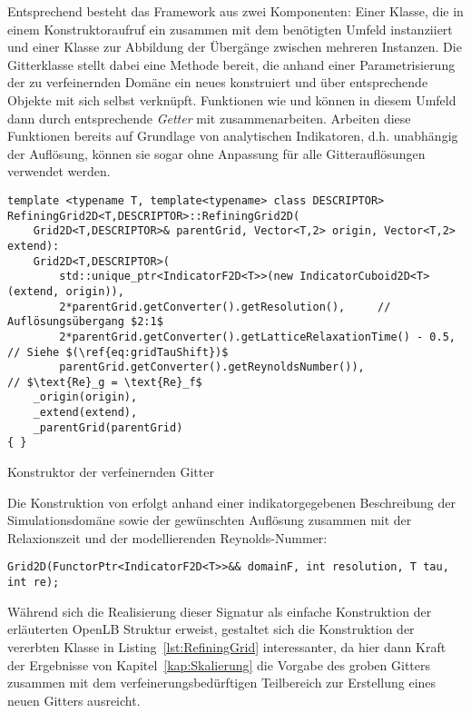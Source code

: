\bigskip
Entsprechend besteht das Framework aus zwei Komponenten: Einer  Klasse, die in einem Konstruktoraufruf ein  zusammen mit dem benötigten Umfeld instanziiert und einer  Klasse zur Abbildung der Übergänge zwischen mehreren  Instanzen. Die Gitterklasse stellt dabei eine Methode  bereit, die anhand einer Parametrisierung der zu verfeinernden Domäne ein neues  konstruiert und über entsprechende  Objekte mit sich selbst verknüpft. Funktionen wie  und  können in diesem Umfeld dann durch entsprechende \emph{Getter} mit  zusammenarbeiten. Arbeiten diese Funktionen bereits auf Grundlage von analytischen Indikatoren, d.h. unabhängig der Auflösung, können sie sogar ohne Anpassung für alle Gitterauflösungen verwendet werden.

\begin{listing}[H]
\begin{verbatim}
template <typename T, template<typename> class DESCRIPTOR>
RefiningGrid2D<T,DESCRIPTOR>::RefiningGrid2D(
	Grid2D<T,DESCRIPTOR>& parentGrid, Vector<T,2> origin, Vector<T,2> extend):
	Grid2D<T,DESCRIPTOR>(
		std::unique_ptr<IndicatorF2D<T>>(new IndicatorCuboid2D<T>(extend, origin)),
		2*parentGrid.getConverter().getResolution(),     // Auflösungsübergang $2:1$
		2*parentGrid.getConverter().getLatticeRelaxationTime() - 0.5, // Siehe $(\ref{eq:gridTauShift})$
		parentGrid.getConverter().getReynoldsNumber()),               // $\text{Re}_g = \text{Re}_f$
	_origin(origin),
	_extend(extend),
	_parentGrid(parentGrid)
{ }
\end{verbatim}
\caption{Konstruktor der verfeinernden Gitter}
\label{lst:RefiningGrid}
\end{listing}

Die Konstruktion von  erfolgt anhand einer indikatorgegebenen Beschreibung der Simulationsdomäne sowie der gewünschten Auflösung zusammen mit der Relaxionszeit und der modellierenden Reynolds-Nummer:
\begin{verbatim}
Grid2D(FunctorPtr<IndicatorF2D<T>>&& domainF, int resolution, T tau, int re);
\end{verbatim}
Während sich die Realisierung dieser Signatur als einfache Konstruktion der erläuterten OpenLB Struktur erweist, gestaltet sich die Konstruktion der vererbten  Klasse in Listing~\ref{lst:RefiningGrid} interessanter, da hier dann Kraft der Ergebnisse von Kapitel~\ref{kap:Skalierung} die Vorgabe des groben Gitters zusammen mit dem verfeinerungsbedürftigen Teilbereich zur Erstellung eines neuen Gitters ausreicht.

